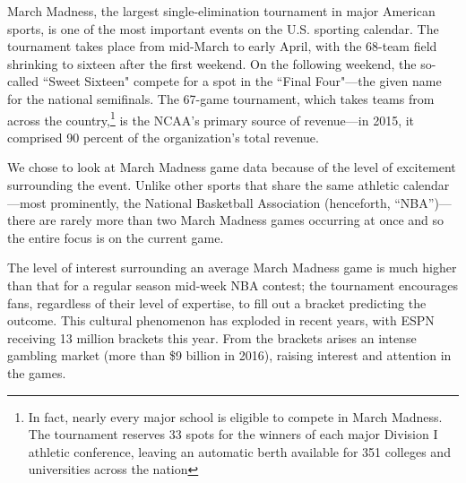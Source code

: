 \documentclass[12pt]{article}
\begin{document}
\begin{doublespacing}
March Madness, the largest single-elimination tournament in major American sports, is one of the most important events on the U.S. sporting calendar. The tournament takes place from mid-March to early April, with the 68-team field shrinking to sixteen after the first weekend. On the following weekend, the so-called ``Sweet Sixteen" compete for a spot in the ``Final Four"---the given name for the national semifinals. The 67-game tournament, which takes teams from across the country,\footnote{In fact, nearly every major school is eligible to compete in March Madness. The tournament reserves 33 spots for the winners of each major Division I athletic conference, leaving an automatic berth available for 351 colleges and universities across the nation} is the NCAA's primary source of revenue---in 2015, it comprised 90 percent of the organization's total revenue. 

We chose to look at March Madness game data because of the level of excitement surrounding the event. Unlike other sports that share the same athletic calendar---most prominently, the National Basketball Association (henceforth, ``NBA'')---there are rarely more than two March Madness games occurring at once and so the entire focus is on the current game. 

The level of interest surrounding an average March Madness game is much higher than that for a regular season mid-week NBA contest; the tournament encourages fans, regardless of their level of expertise, to fill out a bracket predicting the outcome. This cultural phenomenon has exploded in recent years, with ESPN receiving 13 million brackets this year. From the brackets arises an intense gambling market (more than \$9 billion in 2016), raising interest and attention in the games. 


\end{doublespacing}
\end{document}
